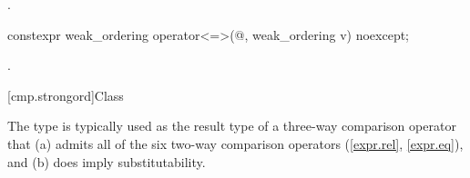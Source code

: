 \begin{itemdescr}
\pnum
\returns
{}.
\end{itemdescr}

%
\begin{itemdecl}
constexpr weak_ordering operator<=>(@\unspec@, weak_ordering v) noexcept;
\end{itemdecl}

\begin{itemdescr}
\pnum
\returns
{}.
\end{itemdescr}

[cmp.strongord]{Class }

\pnum
The  type is typically used
as the result type of a three-way comparison operator
that (a) admits all of the six two-way comparison operators (\ref{expr.rel}, \ref{expr.eq}),
and (b) does imply substitutability.

